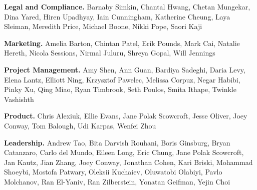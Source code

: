 \textbf{Legal and Compliance.} Barnaby Simkin, Chantal Hwang, Chetan Mungekar, Dina Yared, Hiren Upadhyay, Iain Cunningham, Katherine Cheung, Laya Sleiman, Meredith Price, Michael Boone, Nikki Pope, Saori Kaji

\textbf{Marketing.} Amelia Barton, Chintan Patel, Erik Pounds, Mark Cai, Natalie Hereth, Nicola Sessions, Nirmal Juluru, Shreya Gopal, Will Jennings

\textbf{Project Management.} Amy Shen, Ann Guan, Bardiya Sadeghi, Daria Levy, Elena Lantz, Elliott Ning, Krzysztof Pawelec, Melissa Corpuz, Negar Habibi, Pinky Xu, Qing Miao, Ryan Timbrook, Seth Poulos, Smita Ithape, Twinkle Vashishth

\textbf{Product.}  Chris Alexiuk, Ellie Evans, Jane Polak Scowcroft, Jesse Oliver, Joey Conway, Tom Balough, Udi Karpas, Wenfei Zhou

\textbf{Leadership.} Andrew Tao, Bita Darvish Rouhani, Boris Ginsburg, Bryan Catanzaro, Carlo del Mundo, Eileen Long, Eric Chung, Jane Polak Scowcroft, Jan Kautz, Jian Zhang, Joey Conway, Jonathan Cohen, Kari Briski, Mohammad Shoeybi, Mostofa Patwary, Oleksii Kuchaiev, Oluwatobi Olabiyi, Pavlo Molchanov, Ran El-Yaniv, Ran Zilberstein, Yonatan Geifman, Yejin Choi

\newpage